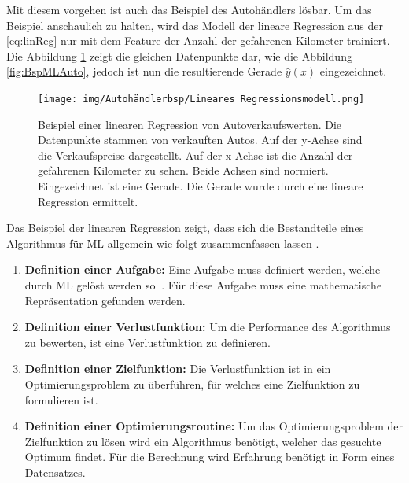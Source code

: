 Mit diesem vorgehen ist auch das Beispiel des Autohändlers lösbar. Um das Beispiel anschaulich zu halten, wird das Modell der lineare Regression aus der \autoref{eq:linReg} nur mit dem \gls{Feature} der Anzahl der gefahrenen Kilometer trainiert. Die Abbildung \ref{fig:BspMLAutoMitReg} zeigt die gleichen Datenpunkte dar, wie die Abbildung \ref{fig:BspMLAuto}, jedoch ist nun die resultierende Gerade \(\hat{y}(x)\) eingezeichnet. 

\begin{figure}[htb]
    \centering
    \texttt{[image: img/Autohändlerbsp/Lineares Regressionsmodell.png]}
    \caption[Beispiel einer linearen Regression von Autoverkaufswerten.]{Beispiel einer linearen Regression von Autoverkaufswerten. Die Datenpunkte stammen von verkauften Autos. Auf der y-Achse sind die Verkaufspreise dargestellt. Auf der x-Achse ist die Anzahl der gefahrenen Kilometer zu sehen. Beide Achsen sind normiert. Eingezeichnet ist eine Gerade. Die Gerade wurde durch eine lineare Regression ermittelt.}
    \label{fig:BspMLAutoMitReg}
\end{figure}

Das Beispiel der linearen Regression zeigt, dass sich die Bestandteile eines Algorithmus für \gls{ML} allgemein wie folgt zusammenfassen lassen \cite{Burkov.2019, Mitchell.1997, Goodfellow.2016}.

\begin{enumerate}
    \item \textbf{Definition einer Aufgabe:} Eine Aufgabe muss definiert werden, welche durch \gls{ML} gelöst werden soll. Für diese Aufgabe muss eine mathematische Repräsentation gefunden werden.
    \item \textbf{Definition einer \gls{Verlustfunktion}:} Um die Performance des Algorithmus zu bewerten, ist eine \gls{Verlustfunktion} zu definieren.
    \item \textbf{Definition einer \gls{Zielfunktion}:} Die \gls{Verlustfunktion} ist in ein Optimierungsproblem zu überführen, für welches eine \gls{Zielfunktion} zu formulieren ist.
    \item \textbf{Definition einer Optimierungsroutine:} Um das Optimierungsproblem der \gls{Zielfunktion} zu lösen wird ein Algorithmus benötigt, welcher das gesuchte Optimum findet. Für die Berechnung wird Erfahrung benötigt in Form eines Datensatzes.
\end{enumerate}


